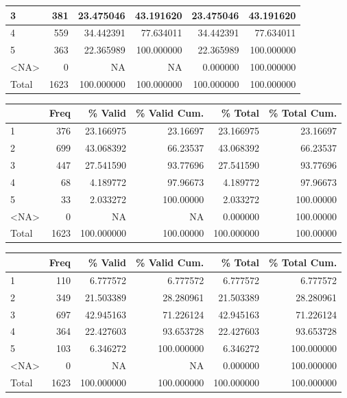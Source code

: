 \documentclass[
  letterpaper,
  DIV=11,
  numbers=noendperiod]{scrartcl}
\begin{document}
\begin{table}
\begin{tabular}[t]{l|r|r|r|r|r}
\hline
3 & 381 & 23.475046 & 43.191620 & 23.475046 & 43.191620\\
\hline
4 & 559 & 34.442391 & 77.634011 & 34.442391 & 77.634011\\
\hline
5 & 363 & 22.365989 & 100.000000 & 22.365989 & 100.000000\\
\hline
<NA> & 0 & NA & NA & 0.000000 & 100.000000\\
\hline
Total & 1623 & 100.000000 & 100.000000 & 100.000000 & 100.000000\\
\hline
\end{tabular}
\centering
\begin{tabular}[t]{l|r|r|r|r|r}
\hline
  & Freq & \% Valid & \% Valid Cum. & \% Total & \% Total Cum.\\
\hline
1 & 376 & 23.166975 & 23.16697 & 23.166975 & 23.16697\\
\hline
2 & 699 & 43.068392 & 66.23537 & 43.068392 & 66.23537\\
\hline
3 & 447 & 27.541590 & 93.77696 & 27.541590 & 93.77696\\
\hline
4 & 68 & 4.189772 & 97.96673 & 4.189772 & 97.96673\\
\hline
5 & 33 & 2.033272 & 100.00000 & 2.033272 & 100.00000\\
\hline
<NA> & 0 & NA & NA & 0.000000 & 100.00000\\
\hline
Total & 1623 & 100.000000 & 100.00000 & 100.000000 & 100.00000\\
\hline
\end{tabular}
\centering
\begin{tabular}[t]{l|r|r|r|r|r}
\hline
  & Freq & \% Valid & \% Valid Cum. & \% Total & \% Total Cum.\\
\hline
1 & 110 & 6.777572 & 6.777572 & 6.777572 & 6.777572\\
\hline
2 & 349 & 21.503389 & 28.280961 & 21.503389 & 28.280961\\
\hline
3 & 697 & 42.945163 & 71.226124 & 42.945163 & 71.226124\\
\hline
4 & 364 & 22.427603 & 93.653728 & 22.427603 & 93.653728\\
\hline
5 & 103 & 6.346272 & 100.000000 & 6.346272 & 100.000000\\
\hline
<NA> & 0 & NA & NA & 0.000000 & 100.000000\\
\hline
Total & 1623 & 100.000000 & 100.000000 & 100.000000 & 100.000000\\
\hline
\end{tabular}
\centering
\begin{tabular}[t]{l|r|r|r|r|r}

\end{tabular}
\end{table}
\end{document}
